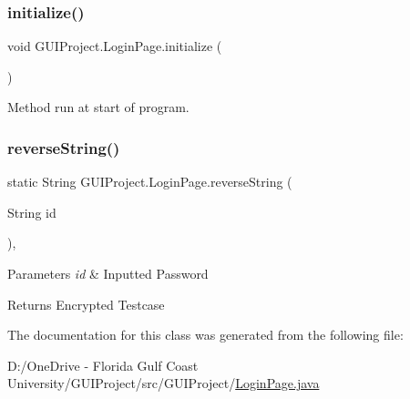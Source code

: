 \subsubsection{\texorpdfstring{initialize()}{initialize()}}
{\footnotesize\ttfamily void G\+U\+I\+Project.\+Login\+Page.\+initialize (\begin{DoxyParamCaption}{ }\end{DoxyParamCaption})}

Method run at start of program. \mbox{\label{class_g_u_i_project_1_1_login_page_a97f648655f6545494a758847c65b49a0}} 
\subsubsection{\texorpdfstring{reverseString()}{reverseString()}}
{\footnotesize\ttfamily static String G\+U\+I\+Project.\+Login\+Page.\+reverse\+String (\begin{DoxyParamCaption}\item[{String}]{id }\end{DoxyParamCaption})\hspace{0.3cm}{\ttfamily [static]}, {\ttfamily [private]}}


\begin{DoxyParams}{Parameters}
{\em id} & Inputted Password \\
\hline
\end{DoxyParams}
\begin{DoxyReturn}{Returns}
Encrypted Testcase 
\end{DoxyReturn}


The documentation for this class was generated from the following file\+:\begin{DoxyCompactItemize}
\item 
D\+:/\+One\+Drive -\/ Florida Gulf Coast University/\+G\+U\+I\+Project/src/\+G\+U\+I\+Project/\mbox{\hyperlink{_login_page_8java}{Login\+Page.\+java}}\end{DoxyCompactItemize}
